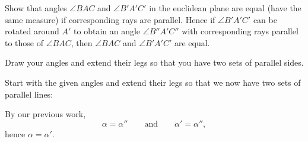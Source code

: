 \documentclass{ximera}
\begin{document}
\begin{question}
Show that angles $\angle BAC$ and $\angle B'A'C'$ in the
  euclidean plane are equal (have the same measure) if corresponding
  rays are parallel. Hence if $\angle B'A'C'$ can be rotated around
  $A'$ to obtain an angle $\angle B''A'C''$ with corresponding rays
  parallel to those of $\angle BAC$, then $\angle BAC$ and $\angle
  B'A'C'$ are equal.
\begin{solution}
\begin{hint}
Draw your angles and extend their legs so that you have two sets of
parallel sides.
\end{hint}
Start with the given angles and extend their legs so that we now have two sets of parallel lines:
\begin{image}
\end{image}
By our previous work,
\[
\alpha = \alpha'' \qquad\text{and}\qquad \alpha' = \alpha'',
\]
hence $\alpha = \alpha'$.
\end{solution}
\end{question}
\end{document}
